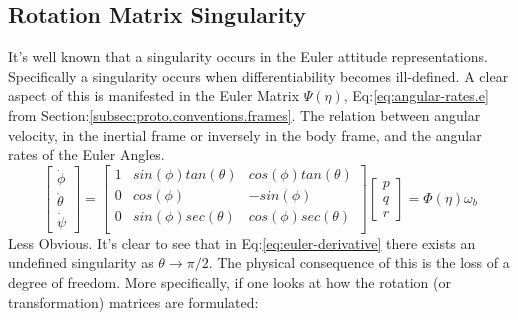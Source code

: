 \subsection{Rotation Matrix Singularity}\label{subsec:dynamics.rigidbody.singularity}
It's well known that a singularity occurs in the Euler attitude representations. Specifically a singularity occurs when differentiability becomes ill-defined. A clear aspect of this is manifested in the Euler Matrix $\Psi(\eta)$, Eq:\ref{eq:angular-rates.e} from Section:\ref{subsec:proto.conventions.frames}. The relation between angular velocity, in the inertial frame or inversely in the body frame, and the angular rates of the Euler Angles.
\begin{equation}\label{eq:euler-derivative}
\begin{bmatrix}
\dot{\phi}\\
\dot{\theta}\\
\dot{\psi}
\end{bmatrix}
=\begin{bmatrix}
1 & sin(\phi)tan(\theta) & cos(\phi)tan(\theta)\\
0 & cos(\phi) & -sin(\phi)\\
0 & sin(\phi)sec(\theta) & cos(\phi)sec(\theta)\\
\end{bmatrix}
\begin{bmatrix}
p\\
q\\
r
\end{bmatrix}
=\Phi(\eta)\omega_b
\end{equation}
\newpage
Less Obvious.
It's clear to see that in Eq:\ref{eq:euler-derivative} there exists an undefined singularity as $\theta\rightarrow\pi/2$. The physical consequence of this is the loss of a degree of freedom. More specifically, if one looks at how the rotation (or transformation) matrices are formulated:
